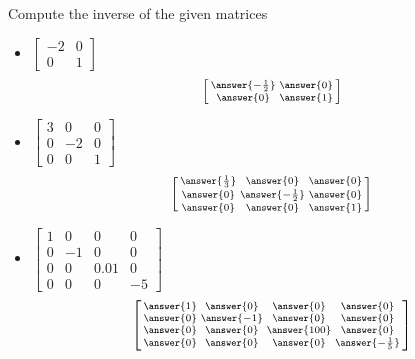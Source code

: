 \documentclass{ximera}
\begin{document}
\begin{exercise}
    Compute the inverse of the given matrices
    \begin{itemize}
        \item
        $\begin{bmatrix}
            -2 & 0 \\
            0 & 1 
        \end{bmatrix}$
        \[
            \left[\begin{smallmatrix} \answer{-\frac{1}{2}} & \answer{0} \\ \answer{0} & \answer{1} \end{smallmatrix}\right]
        \]
        \item
        $\begin{bmatrix}
            3 & 0 & 0 \\
            0 & -2 & 0 \\ 
            0 & 0 & 1
        \end{bmatrix}$
        \[
            \left[\begin{smallmatrix} \answer{\frac{1}{3}} & \answer{0} & \answer{0} \\ \answer{0} & \answer{-\frac{1}{2}} & \answer{0} \\ \answer{0} & \answer{0} & \answer{1} \end{smallmatrix}\right]
        \]
        \item
        $\begin{bmatrix}
            1 & 0 & 0 & 0 \\
            0 & -1 & 0 & 0 \\ 
            0 & 0 & 0.01 & 0 \\
            0 & 0 & 0 & -5
        \end{bmatrix}$
        \[
            \left[\begin{smallmatrix} \answer{1} & \answer{0} & \answer{0} & \answer{0} \\ \answer{0} & \answer{-1} & \answer{0} & \answer{0} \\ \answer{0} & \answer{0} & \answer{100}  & \answer{0} \\ \answer{0} & \answer{0} & \answer{0} & \answer{-\frac{1}{5}} \end{smallmatrix}\right]
        \]
    \end{itemize}
\end{exercise}
\end{document}

